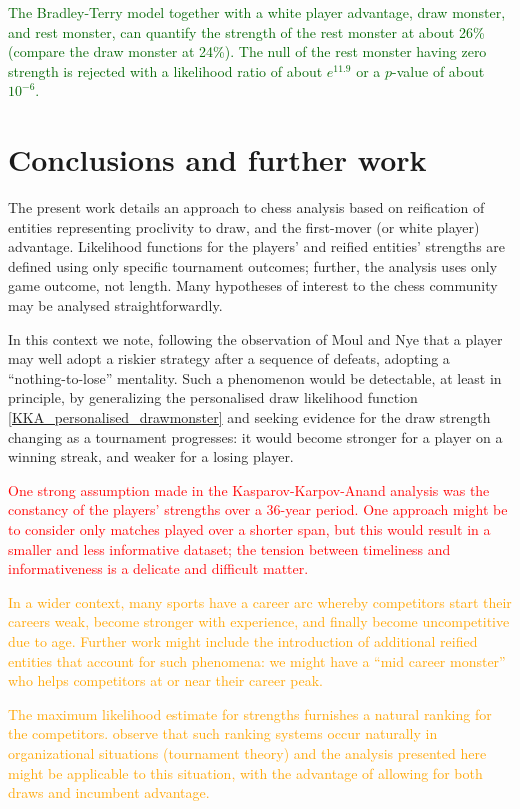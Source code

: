 \documentclass[review]{elsarticle}
\begin{document}
\textcolor{DarkGreen}{The Bradley-Terry model together with a white
  player advantage, draw monster, and rest monster, can quantify the
  strength of the rest monster at about 26\% (compare the draw monster
  at 24\%).  The null of the rest monster having zero strength is
  rejected with a likelihood ratio of about $e^{11.9}$ or a $p$-value
  of about $10^{-6}$.}

\section{Conclusions and further work}

The present work details an approach to chess analysis based on
reification of entities representing proclivity to draw, and the
first-mover (or white player) advantage.  Likelihood functions for the
players' and reified entities' strengths are defined using only
specific tournament outcomes; further, the analysis uses only game
outcome, not length.  Many hypotheses of interest to the chess
community may be analysed straightforwardly.

In this context we note, following the observation of Moul and Nye
that a player may well adopt a riskier strategy after a sequence of
defeats, adopting a ``nothing-to-lose'' mentality.  Such a phenomenon
would be detectable, at least in principle, by generalizing the
personalised draw likelihood function
\ref{KKA_personalised_drawmonster} and seeking evidence for the draw
strength changing as a tournament progresses: it would become stronger
for a player on a winning streak, and weaker for a losing player.

\textcolor{red}{One strong assumption made in the
  Kasparov-Karpov-Anand analysis was the constancy of the players'
  strengths over a 36-year period.  One approach might be to consider
  only matches played over a shorter span, but this would result in a
  smaller and less informative dataset; the tension between timeliness
  and informativeness is a delicate and difficult matter.}

\textcolor{orange}{In a wider context, many sports have a career arc
  whereby competitors start their careers weak, become stronger with
  experience, and finally become uncompetitive due to age.  Further
  work might include the introduction of additional reified entities
  that account for such phenomena: we might have a ``mid career
  monster'' who helps competitors at or near their career peak.}

\textcolor{orange}{The maximum likelihood estimate for strengths
  furnishes a natural ranking for the competitors.  \cite{lazear1981}
  observe that such ranking systems occur naturally in organizational
  situations (tournament theory) and the analysis presented here might
  be applicable to this situation, with the advantage of allowing for
  both draws and incumbent advantage.}
 
\end{document}
